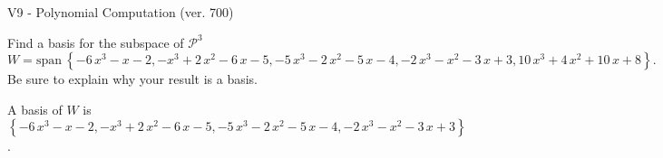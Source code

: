 \begin{exercise}
  \begin{exerciseTitle}V9 - Polynomial Computation (ver. 700)\end{exerciseTitle}
  \begin{exerciseStatement}
    Find a basis for the subspace of \(\mathcal{P}^3\) 
\[W=\mathrm{span}\ \left\{-6 \, x^{3} - x - 2 , -x^{3} + 2 \, x^{2} - 6 \, x - 5 , -5 \, x^{3} - 2 \, x^{2} - 5 \, x - 4 , -2 \, x^{3} - x^{2} - 3 \, x + 3 , 10 \, x^{3} + 4 \, x^{2} + 10 \, x + 8\right\}.\]
 Be sure to explain why your result is a basis.


  \end{exerciseStatement}
  \begin{exerciseAnswer}
   A basis of \(W\) is  \(\left\{-6 \, x^{3} - x - 2 , -x^{3} + 2 \, x^{2} - 6 \, x - 5 , -5 \, x^{3} - 2 \, x^{2} - 5 \, x - 4 , -2 \, x^{3} - x^{2} - 3 \, x + 3\right\}\).
  


  \end{exerciseAnswer}
\end{exercise}